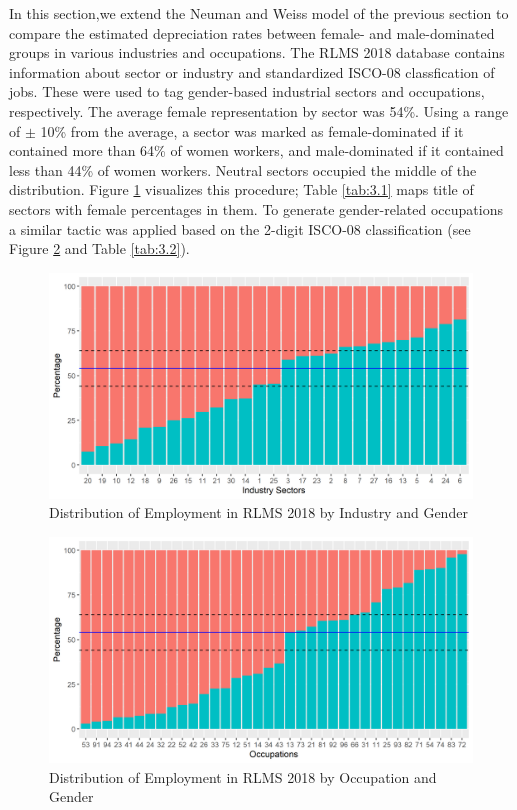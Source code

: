 \documentclass[alpha-refs]{wiley-article-02b}
\begin{document}
In this section,we extend the Neuman and Weiss model of the previous section to compare the estimated depreciation rates between female- and male-dominated groups in various industries and occupations. The RLMS 2018 database contains information about sector or industry and standardized ISCO-08 classfication of jobs. These were used  to tag gender-based industrial sectors and occupations, respectively. The average female representation by sector was 54\%.  Using a range of $\pm$ 10\% from the average, a sector was marked as female-dominated if it contained more than 64\% of women workers, and male-dominated if it contained less than 44\% of women workers. Neutral sectors occupied the middle of the distribution. Figure \ref{fig:3.1} visualizes this procedure; Table \ref{tab:3.1} maps title of sectors with female percentages in them. To generate gender-related occupations a similar tactic was applied based on the 2-digit ISCO-08 classification (see Figure \ref{fig:3.2} and Table \ref{tab:3.2}). 

\begin{figure}[H]
	\centering
	\includegraphics[width=400pt]{gen_ind18.png}
	\caption{Distribution of Employment in RLMS 2018 by Industry and Gender}\label{fig:3.1}
\end{figure}

\begin{figure}[H]
	\centering
	\includegraphics[width=400pt]{gen_occ18.png}
	\caption{Distribution of Employment in RLMS 2018 by Occupation and Gender}\label{fig:3.2}
\end{figure}
	
\end{document}
